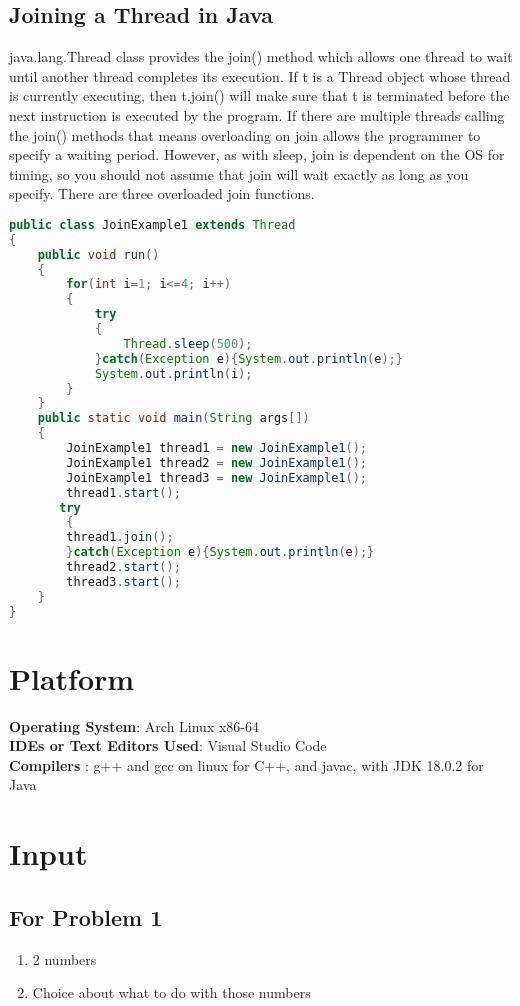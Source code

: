 \documentclass[11pt]{article}
\begin{document}
\subsection{Joining a Thread in Java}
java.lang.Thread class provides the join() method which allows one thread to wait until another thread completes its execution. If t is a Thread object whose thread is currently executing, then t.join() will make sure that t is terminated before the next instruction is executed by the program.
If there are multiple threads calling the join() methods that means overloading on join allows the programmer to specify a waiting period. However, as with sleep, join is dependent on the OS for timing, so you should not assume that join will wait exactly as long as you specify.
There are three overloaded join functions.
\begin{lstlisting}[language=Java]
public class JoinExample1 extends Thread  
{    
    public void run()  
    {    
        for(int i=1; i<=4; i++)  
        {    
            try 
            {    
                Thread.sleep(500);    
            }catch(Exception e){System.out.println(e);}    
            System.out.println(i);    
        }    
    }    
    public static void main(String args[])  
    {   
        JoinExample1 thread1 = new JoinExample1();    
        JoinExample1 thread2 = new JoinExample1();    
        JoinExample1 thread3 = new JoinExample1();    
        thread1.start();   
       try 
        {    
        thread1.join();    
        }catch(Exception e){System.out.println(e);}    
        thread2.start();   
        thread3.start();    
    }    
}
\end{lstlisting}
\section{Platform}
\textbf{Operating System}: Arch Linux x86-64 \\
\textbf{IDEs or Text Editors Used}: Visual Studio Code\\
\textbf{Compilers} : g++ and gcc on linux for C++, and javac, with JDK 18.0.2 for Java\\

\section{Input}
\subsection*{For Problem 1}
\begin{enumerate}
	\item 2 numbers
	\item Choice about what to do with those numbers 
\end{enumerate}
\end{document}
